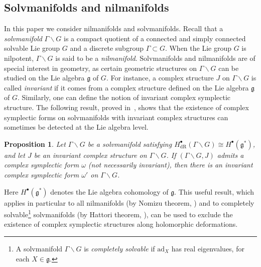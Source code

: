 \documentclass[a4paper]{amsart}
\newtheorem{proposition}[theorem]{Proposition}
\theoremstyle{definition}
\theoremstyle{remark}
\newcommand{\bC}{{\mathbb C}}
\numberwithin{equation}{section}
\begin{document}
\subsection{Solvmanifolds and nilmanifolds} In this paper we consider nilmanifolds and solvmanifolds. Recall that a \emph{solvmanifold} $\Gamma\backslash G$ is a compact quotient of a connected and simply connected solvable Lie group $G$ and a discrete subgroup $\Gamma\subset G$. When the Lie group $G$ is nilpotent, $\Gamma\backslash G$ is said to be a \emph{nilmanifold}. Solvmanifolds and nilmanifolds are of special interest in geometry, as certain geometric structures on $\Gamma\backslash G$ can be studied on the Lie algebra $\mathfrak g$ of $G$. For instance, a complex structure $J$ on $\Gamma\backslash G$ is called \emph{invariant} if it comes from a complex structure defined on the Lie algebra $\mathfrak g$ of $G$. Similarly, one can define the notion of invariant complex symplectic structure. The following result, proved in~\cite[Proposition 6.1]{bazzoni-freibert-latorre-meinke}, shows that the existence of complex symplectic forms on solvmanifolds with invariant complex structures can sometimes be detected at the Lie algebra level.



\begin{proposition}\label{prop:BFLM}{\rm\cite{bazzoni-freibert-latorre-meinke}}
Let $\Gamma\backslash G$ be a solvmanifold satisfying $H^{\bullet}_{\mathrm{dR}}(\Gamma\backslash G)\cong H^{\bullet}(\mathfrak g^*)$, and let $J$ be an invariant complex structure on $\Gamma\backslash G$. If $(\Gamma\backslash G,J)$ admits a complex symplectic form $\omega$ (not necessarily invariant), then there is an invariant complex symplectic form $\omega'$ on $\Gamma\backslash G$.
\end{proposition}

Here $H^{\bullet}(\mathfrak g^*)$ denotes the Lie algebra cohomology of $\mathfrak{g}$. This useful result, which applies in particular to all nilmanifolds (by Nomizu theorem, \cite{Nomizu}) and to completely solvable\footnote{A solvmanifold $\Gamma\backslash G$ is {\em completely solvable} if $\mathrm{ad}_X$ has real eigenvalues, for each $X\in\mathfrak{g}$.} solvmanifolds (by Hattori theorem, \cite{Hattori}), can be used to exclude the existence of complex symplectic structures along holomorphic deformations.
\end{document}
